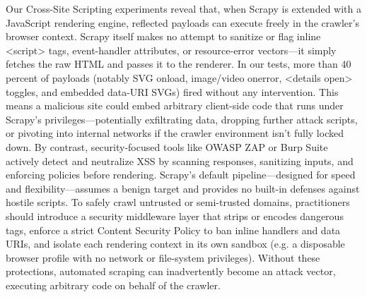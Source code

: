 Our Cross-Site Scripting experiments reveal that, when Scrapy is extended with a JavaScript rendering engine, reflected payloads can execute freely in the crawler’s browser context. Scrapy itself makes no attempt to sanitize or flag inline <script> tags, event-handler attributes, or resource-error vectors—it simply fetches the raw HTML and passes it to the renderer. In our tests, more than 40 percent of payloads (notably SVG onload, image/video onerror, <details open> toggles, and embedded data-URI SVGs) fired without any intervention. This means a malicious site could embed arbitrary client-side code that runs under Scrapy’s privileges—potentially exfiltrating data, dropping further attack scripts, or pivoting into internal networks if the crawler environment isn’t fully locked down.
By contrast, security-focused tools like OWASP ZAP or Burp Suite actively detect and neutralize XSS by scanning responses, sanitizing inputs, and enforcing policies before rendering. Scrapy’s default pipeline—designed for speed and flexibility—assumes a benign target and provides no built-in defenses against hostile scripts. To safely crawl untrusted or semi-trusted domains, practitioners should introduce a security middleware layer that strips or encodes dangerous tags, enforce a strict Content Security Policy to ban inline handlers and data URIs, and isolate each rendering context in its own sandbox (e.g. a disposable browser profile with no network or file-system privileges). Without these protections, automated scraping can inadvertently become an attack vector, executing arbitrary code on behalf of the crawler.
